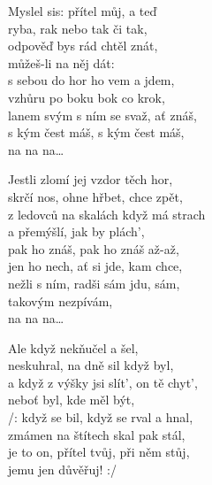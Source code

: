 
\ve{}
Myslel sis: přítel můj, a teď\\
ryba, rak nebo tak či tak,\\
odpověď bys rád chtěl znát,\\
můžeš-li na něj dát:\\
s sebou do hor ho vem a jdem,\\
vzhůru po boku bok co krok,\\
lanem svým s ním se svaž, ať znáš,\\
s kým čest máš, s kým čest máš,\\
na na na\ldots{} 

\ve{}
Jestli zlomí jej vzdor těch hor,\\
skrčí nos, ohne hřbet, chce zpět,\\
z ledovců na skalách když má strach\\
a přemýšlí, jak by plách',\\
pak ho znáš, pak ho znáš až-až,\\
jen ho nech, ať si jde, kam chce,\\
nežli s ním, radši sám jdu, sám,\\
takovým nezpívám,\\
na na na\ldots{}

\ve{}
Ale když nekňučel a šel,\\
neskuhral, na dně sil když byl,\\
a když z výšky jsi slít', on tě chyt',\\
neboť byl, kde měl být,\\
/: když se bil, když se rval a hnal,\\
zmámen na štítech skal pak stál,\\
je to on, přítel tvůj, při něm stůj,\\
jemu jen důvěřuj! :/

\esong